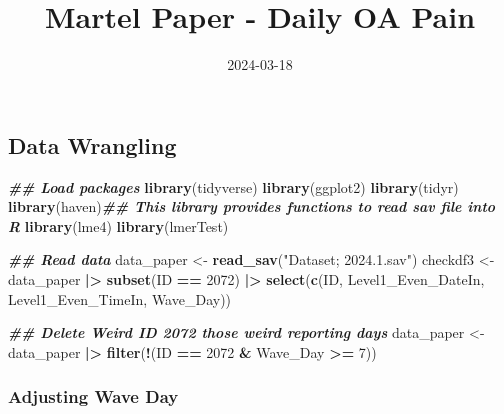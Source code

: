 \documentclass[
  12pt,
]{article}
\title{Martel Paper - Daily OA Pain}
\author{}
\date{\vspace{-2.5em}2024-03-18}
\newenvironment{Shaded}{\begin{snugshade}}{\end{snugshade}}
\newcommand{\DecValTok}[1]{\textcolor[rgb]{0.00,0.00,0.81}{#1}}
\newcommand{\DocumentationTok}[1]{\textcolor[rgb]{0.56,0.35,0.01}{\textbf{\textit{#1}}}}
\newcommand{\FunctionTok}[1]{\textcolor[rgb]{0.13,0.29,0.53}{\textbf{#1}}}
\newcommand{\NormalTok}[1]{#1}
\newcommand{\OtherTok}[1]{\textcolor[rgb]{0.56,0.35,0.01}{#1}}
\newcommand{\SpecialCharTok}[1]{\textcolor[rgb]{0.81,0.36,0.00}{\textbf{#1}}}
\newcommand{\StringTok}[1]{\textcolor[rgb]{0.31,0.60,0.02}{#1}}
\begin{document}
\maketitle

\hypertarget{data-wrangling}{%
\subsection{Data Wrangling}\label{data-wrangling}}

\begin{Shaded}
\begin{Highlighting}[]
\DocumentationTok{\#\# Load packages}
\FunctionTok{library}\NormalTok{(tidyverse)}
\FunctionTok{library}\NormalTok{(ggplot2)}
\FunctionTok{library}\NormalTok{(tidyr)}
\FunctionTok{library}\NormalTok{(haven)}\DocumentationTok{\#\# This library provides functions to read sav file into R}
\FunctionTok{library}\NormalTok{(lme4)}
\FunctionTok{library}\NormalTok{(lmerTest)}
\end{Highlighting}
\end{Shaded}

\begin{Shaded}
\begin{Highlighting}[]
\DocumentationTok{\#\# Read data}
\NormalTok{data\_paper }\OtherTok{\textless{}{-}} \FunctionTok{read\_sav}\NormalTok{(}\StringTok{"Dataset; 2024.1.sav"}\NormalTok{)}
\NormalTok{checkdf3 }\OtherTok{\textless{}{-}}\NormalTok{ data\_paper }\SpecialCharTok{|\textgreater{}} 
  \FunctionTok{subset}\NormalTok{(ID }\SpecialCharTok{==} \DecValTok{2072}\NormalTok{) }\SpecialCharTok{|\textgreater{}} 
  \FunctionTok{select}\NormalTok{(}\FunctionTok{c}\NormalTok{(ID, }
\NormalTok{           Level1\_Even\_DateIn, }
\NormalTok{           Level1\_Even\_TimeIn,}
\NormalTok{           Wave\_Day))}

\DocumentationTok{\#\# Delete Weird ID 2072 those weird reporting days}
\NormalTok{data\_paper }\OtherTok{\textless{}{-}}\NormalTok{ data\_paper }\SpecialCharTok{|\textgreater{}}
  \FunctionTok{filter}\NormalTok{(}\SpecialCharTok{!}\NormalTok{(ID }\SpecialCharTok{==} \DecValTok{2072} \SpecialCharTok{\&}\NormalTok{ Wave\_Day }\SpecialCharTok{\textgreater{}=} \DecValTok{7}\NormalTok{))}
\end{Highlighting}
\end{Shaded}

\hypertarget{adjusting-wave-day}{%
\subsubsection{Adjusting Wave Day}\label{adjusting-wave-day}}
\end{document}
